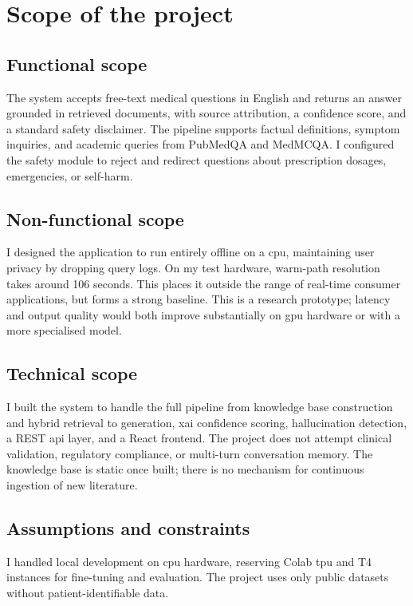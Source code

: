 \section{Scope of the project}

\subsection{Functional scope}

The system accepts free-text medical questions in English and returns an answer grounded in retrieved documents, with source attribution, a confidence score, and a standard safety disclaimer. The pipeline supports factual definitions, symptom inquiries, and academic queries from PubMedQA and MedMCQA. I configured the safety module to reject and redirect questions about prescription dosages, emergencies, or self-harm.

\subsection{Non-functional scope}

I designed the application to run entirely offline on a \ac{cpu}, maintaining user privacy by dropping query logs. On my test hardware, warm-path resolution takes around 106 seconds. This places it outside the range of real-time consumer applications, but forms a strong baseline. This is a research prototype; latency and output quality would both improve substantially on \ac{gpu} hardware or with a more specialised model.

\subsection{Technical scope}

I built the system to handle the full pipeline from knowledge base construction and hybrid retrieval to generation, \ac{xai} confidence scoring, hallucination detection, a REST \ac{api} layer, and a React frontend. The project does not attempt clinical validation, regulatory compliance, or multi-turn conversation memory. The knowledge base is static once built; there is no mechanism for continuous ingestion of new literature.

\subsection{Assumptions and constraints}

I handled local development on \ac{cpu} hardware, reserving Colab \ac{tpu} and T4 instances for fine-tuning and evaluation. The project uses only public datasets without patient-identifiable data.
